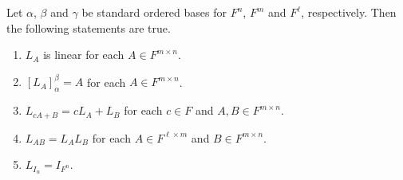 \begin{proposition}
  \label{prop:left-multiplication-transformation}
  Let $\alpha$, $\beta$ and $\gamma$ be standard ordered bases for $F^n$, $F^m$
  and $F^\ell$, respectively.
  Then the following statements are true.
  \begin{enumerate}
    \item $L_A$ is linear for each $A \in F^{m \times n}$.
    \item $[L_A]_\alpha^\beta = A$ for each $A \in F^{m \times n}$.
    \item $L_{cA+B} = cL_A + L_B$ for each $c \in F$ and
    $A, B \in F^{m \times n}$.
    \item $L_{AB} = L_AL_B$ for each $A \in F^{\ell \times m}$ and
    $B \in F^{m \times n}$.
    \item $L_{I_n} = I_{F^n}$.
  \end{enumerate}
\end{proposition}
